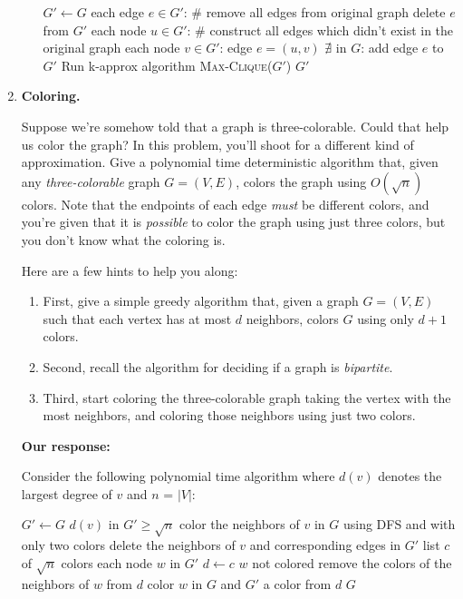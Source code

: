 \documentclass[11pt]{article}
\newcommand{\prob}[1]{\textsc{#1}\xspace}
\newcommand{\isopt}{\prob{Max-Independent-Set}}
\newcommand{\cliqueopt}{\prob{Max-Clique}}
\begin{document}
\begin{enumerate}
\begin{enumerate}
    \begin{codebox}
    \Procname{\isopt $k$-approx($G=(V,E)$)}
    \li $G' \leftarrow G$
    \li \For each edge $e \in G'$: \# remove all edges from original graph
        \Do 
        \li delete $e$ from $G'$
        \End
    \li \For each node $u \in G'$: \# construct all edges which didn't exist in the original graph
        \Do
        \li \For each node $v \in G'$:
            \Do
            \li \If edge $e = (u, v)$ $\nexists$ in $G$:
            \Do
                \li add edge $e$ to $G'$
            \End
        \End
    \End
    \li Run k-approx algorithm \cliqueopt($G'$)
    \li \Return $G'$
    \end{codebox}
      
    
  \end{enumerate}

\item {\bf Coloring.} 

  Suppose we're somehow told that a graph is
  three-colorable. Could that help us color the graph?  In this
  problem, you'll shoot for a different kind of approximation.  Give a
  polynomial time deterministic algorithm that, given any
  \emph{three-colorable} graph $G = (V,E)$, colors the graph using
  $O(\sqrt{n})$ colors.  Note that the endpoints of each edge
  \emph{must} be different colors, and you're given that it is
  \emph{possible} to color the graph using just three colors, but you
  don't know what the coloring is.

  Here are a few hints to help you along:
  \begin{enumerate}
  \item First, give a simple greedy algorithm that, given a graph $G =
    (V,E)$ such that each vertex has at most $d$ neighbors, colors $G$
    using only $d+1$ colors.
  \item Second, recall the algorithm for deciding if a graph is
    \emph{bipartite}.
  \item Third, start coloring the three-colorable graph taking the
    vertex with the most neighbors, and coloring those neighbors using
    just two colors.
  \end{enumerate}
  
  \textbf{Our response:} 
  
Consider the following polynomial time algorithm where $d(v)$ denotes the largest degree of $v$ and $n$ = $|V|$:
      
    \begin{codebox}
        \li $G' \leftarrow G$
        \li \While $d(v)$ in $G' \geq \sqrt{n}$ \Do
        \li color the neighbors of $v$ in $G$ using DFS and with only two colors
        \li delete the neighbors of $v$ and corresponding edges in $G'$ \End
        \li list $c$ of $\sqrt{n}$ colors
        \li \For each node $w$ in $G'$ \Do
        \li $d \leftarrow c$
        \li \If $w$ not colored \Do
        \li remove the colors of the neighbors of $w$ from $d$
        \li color $w$ in $G$ and $G'$ a color from $d$ \End \End \End
        \li \Return $G$
    \end{codebox}
    

\end{enumerate}
\end{document}

